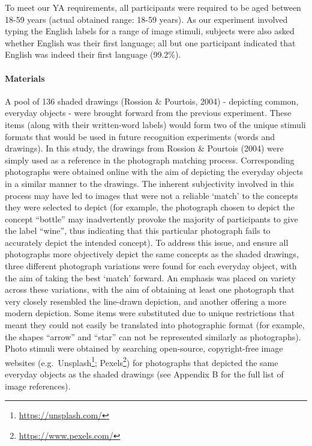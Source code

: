 \documentclass[
  11pt,
]{article}
\begin{document}
To meet our YA requirements, all participants were required to be aged
between 18-59 years (actual obtained range: 18-59 years). As our
experiment involved typing the English labels for a range of image
stimuli, subjects were also asked whether English was their first
language; all but one participant indicated that English was indeed
their first language (99.2\%).

\hypertarget{materials-1}{%
\paragraph{Materials}\label{materials-1}}

A pool of 136 shaded drawings (Rossion \& Pourtois, 2004) - depicting
common, everyday objects - were brought forward from the previous
experiment. These items (along with their written-word labels) would
form two of the unique stimuli formats that would be used in future
recognition experiments (words and drawings). In this study, the
drawings from Rossion \& Pourtois (2004) were simply used as a reference
in the photograph matching process. Corresponding photographs were
obtained online with the aim of depicting the everyday objects in a
similar manner to the drawings. The inherent subjectivity involved in
this process may have led to images that were not a reliable `match' to
the concepts they were selected to depict (for example, the photograph
chosen to depict the concept ``bottle'' may inadvertently provoke the
majority of participants to give the label ``wine'', thus indicating
that this particular photograph fails to accurately depict the intended
concept). To address this issue, and ensure all photographs more
objectively depict the same concepts as the shaded drawings, three
different photograph variations were found for each everyday object,
with the aim of taking the best `match' forward. An emphasis was placed
on variety across these variations, with the aim of obtaining at least
one photograph that very closely resembled the line-drawn depiction, and
another offering a more modern depiction. Some items were substituted
due to unique restrictions that meant they could not easily be
translated into photographic format (for example, the shapes ``arrow''
and ``star'' can not be represented similarly as photographs). Photo
stimuli were obtained by searching open-source, copyright-free image
websites (e.g.~Unsplash\footnote{\url{https://unsplash.com/}};
Pexels\footnote{\url{https://www.pexels.com/}}) for photographs that
depicted the same everyday objects as the shaded drawings (see Appendix
B for the full list of image references).
\end{document}
